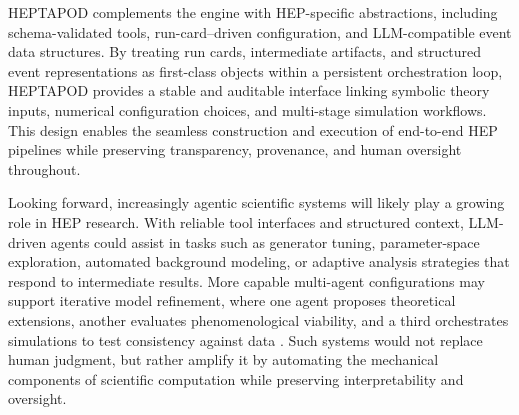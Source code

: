 \documentclass[11pt,oneside]{article}
\numberwithin{equation}{section}
\newcommand{\pkgname}{HEPTAPOD\xspace}
\begin{document}
\pkgname{} complements the \orchestralai engine with HEP-specific abstractions, including schema-validated tools, run-card–driven configuration, and LLM-compatible event data structures. By treating run cards, intermediate artifacts, and structured event representations as first-class objects within a persistent orchestration loop, \pkgname{} provides a stable and auditable interface linking symbolic theory inputs, numerical configuration choices, and multi-stage simulation workflows. This design enables the seamless construction and execution of end-to-end HEP pipelines while preserving transparency, provenance, and human oversight throughout.

Looking forward, increasingly agentic scientific systems will likely play a growing role in HEP research. 
With reliable tool interfaces and structured context, LLM-driven agents could assist in tasks such as generator tuning, parameter-space exploration, automated background modeling, or adaptive analysis strategies that respond to intermediate results. 
More capable multi-agent configurations may support iterative model refinement, where one agent proposes theoretical extensions, another evaluates phenomenological viability, and a third orchestrates simulations to test consistency against data \cite{jiang2025agenticscimlcollaborativemultiagentsystems}. 
Such systems would not replace human judgment, but rather amplify it by automating the mechanical components of scientific computation while preserving interpretability and oversight.
\end{document}
